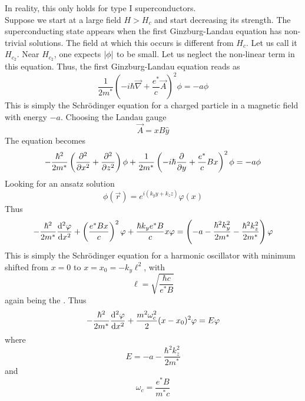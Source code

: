 \documentclass[12pt,a4paper,titlepage]{article}
\newcommand{\ul}[1]{\underline{\smash{#1}}} %
\begin{document}
\begin{center}
\end{center}
In reality, this only holds for type I superconductors.\\

Suppose we start at a large field $H>H_{c}$ and start decreasing its strength. The superconducting state appears when the first Ginzburg-Landau equation has non-trivial solutions. The field at which this occurs is different from $H_{c}$. Let us call it $H_{c_{2}}$. Near $H_{c_{2}}$, one expects $\abs{\phi}$ to be small. Let us neglect the non-linear term in this equation. Thus, the first Ginzburg-Landau equation reads as
\begin{equation}
\frac{1}{2m^{*}}\left(-i\hbar\vec{\nabla}+\frac{e^{*}}{c}\vec{A}\right)^{2}\phi=-a\phi
\end{equation}
This is simply the Schr\"{o}dinger equation for a charged particle in a magnetic field with energy $-a$. Choosing the Landau gauge
\begin{equation}
\vec{A}=xB\hat{y}
\end{equation}
The equation becomes
\begin{equation}
-\frac{\hbar^{2}}{2m^{*}}\left(\pdv[2]{x}+\pdv[2]{z}\right)\phi+\frac{1}{2m^{*}}\left(-i\hbar\pdv{y}+\frac{e^{*}}{c}Bx\right)^{2}\phi=-a\phi
\end{equation}
Looking for an ansatz solution
\begin{equation}
\phi(\vec{r})=e^{i(k_{y}y+k_{z}z)}\varphi(x)
\end{equation}
Thus
\begin{equation}
-\frac{\hbar^{2}}{2m^{*}}\dv[2]{\varphi}{x}+\left(\frac{e^{*}Bx}{c}\right)^{2}\varphi+\frac{\hbar k_{y}e^{*}B}{c}x\varphi=\left(-a-\frac{\hbar^{2}k_{y}^{2}}{2m^{*}}-\frac{\hbar^{2}k_{z}^{2}}{2m^{*}}\right)\varphi
\end{equation}
This is simply the Schr\"{o}dinger equation for a harmonic oscillator with minimum shifted from $x=0$ to $x=x_{0}=-k_{y}\ell^{2}$, with
\begin{equation}
\ell=\sqrt{\frac{\hbar c}{e^{*}B}}
\end{equation}
again being the \ul{magnetic length}. Thus
\begin{equation}
-\frac{\hbar^{2}}{2m^{*}}\dv[2]{\varphi}{x}+\frac{m^{2}\omega_{c}^{2}}{2}(x-x_{0})^{2}\varphi=E\varphi
\end{equation}
where
\begin{equation}
E=-a-\frac{\hbar^{2}k_{z}^{2}}{2m^{*}}
\end{equation}
and
\begin{equation}
\omega_{c}=\frac{e^{*}B}{m^{*}c}
\end{equation}
\end{document}
